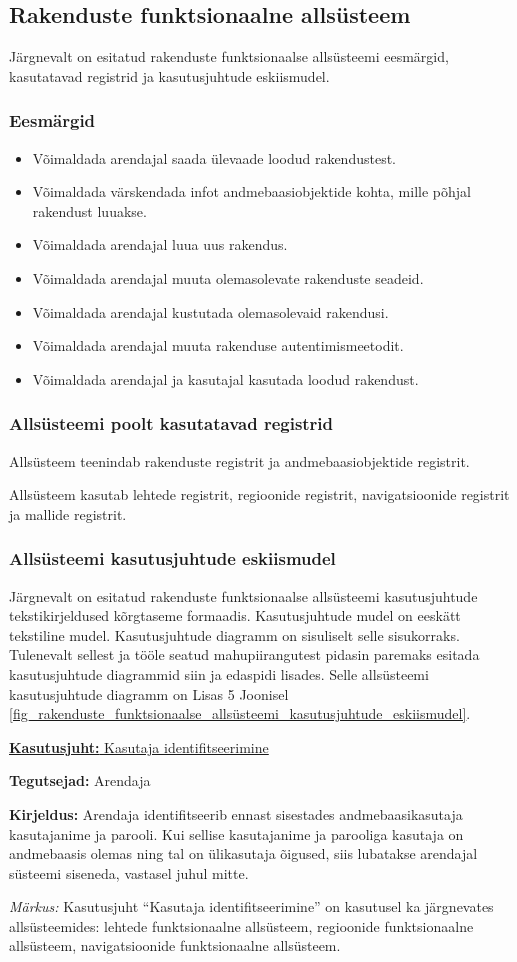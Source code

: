 \documentclass[a4paper,12pt]{article} %
\begin{document}
\subsection{Rakenduste funktsionaalne allsüsteem}
Järgnevalt on esitatud rakenduste funktsionaalse allsüsteemi eesmärgid, kasutatavad registrid ja kasutusjuhtude eskiismudel.
\subsubsection{Eesmärgid}
\begin{itemize}
\item Võimaldada arendajal saada ülevaade loodud rakendustest.
\item Võimaldada värskendada infot andmebaasiobjektide kohta, mille põhjal rakendust luuakse.
\item Võimaldada arendajal luua uus rakendus.
\item Võimaldada arendajal muuta olemasolevate rakenduste seadeid.
\item Võimaldada arendajal kustutada olemasolevaid rakendusi.
\item Võimaldada arendajal muuta rakenduse autentimismeetodit.
\item Võimaldada arendajal ja kasutajal kasutada loodud rakendust.
\end{itemize}
\subsubsection{Allsüsteemi poolt kasutatavad registrid}
Allsüsteem teenindab rakenduste registrit ja andmebaasiobjektide registrit.\par
Allsüsteem kasutab lehtede registrit, regioonide registrit, navigatsioonide registrit ja mallide registrit.
\subsubsection{Allsüsteemi kasutusjuhtude eskiismudel}
Järgnevalt on esitatud rakenduste funktsionaalse allsüsteemi kasutusjuhtude tekstikirjeldused kõrgtaseme formaadis. Kasutusjuhtude mudel on eeskätt tekstiline mudel. Kasutusjuhtude diagramm on sisuliselt selle sisukorraks. Tulenevalt sellest ja tööle seatud mahupiirangutest pidasin paremaks esitada kasutusjuhtude diagrammid siin ja edaspidi lisades. Selle allsüsteemi kasutusjuhtude diagramm on Lisas 5 Joonisel \ref{fig_rakenduste_funktsionaalse_allsüsteemi_kasutusjuhtude_eskiismudel}.

\underline{\textbf{Kasutusjuht:} Kasutaja identifitseerimine}
\par
\textbf{Tegutsejad:} Arendaja
\par
\textbf{Kirjeldus:} Arendaja identifitseerib ennast sisestades andmebaasikasutaja kasutajanime ja parooli. Kui sellise kasutajanime ja parooliga kasutaja on andmebaasis olemas ning tal on ülikasutaja õigused, siis lubatakse arendajal süsteemi siseneda, vastasel juhul mitte.
\par
\textit{Märkus:} Kasutusjuht  ``Kasutaja identifitseerimine'' on kasutusel ka järgnevates allsüsteemides: lehtede funktsionaalne allsüsteem, regioonide funktsionaalne allsüsteem, navigatsioonide funktsionaalne allsüsteem.\par
\end{document}
